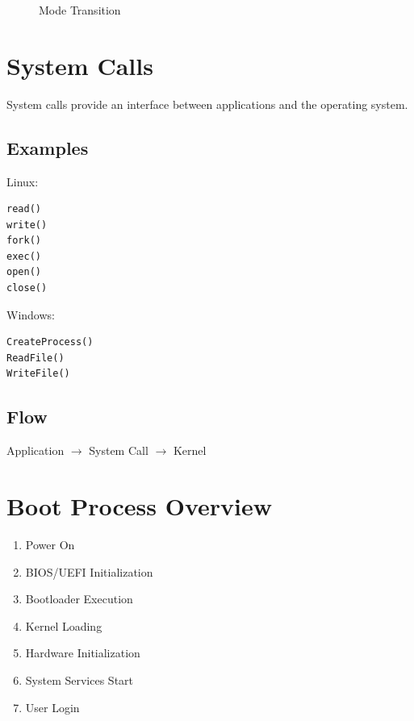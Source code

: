 \begin{figure}[H]
\centering
{}
\caption{Mode Transition}
\end{figure}

\section{System Calls}

System calls provide an interface between applications and the operating system.

\subsection{Examples}

Linux:

\begin{verbatim}
read()
write()
fork()
exec()
open()
close()
\end{verbatim}

Windows:

\begin{verbatim}
CreateProcess()
ReadFile()
WriteFile()
\end{verbatim}

\subsection{Flow}

Application $\rightarrow$ System Call $\rightarrow$ Kernel

\section{Boot Process Overview}

\begin{enumerate}
\item Power On
\item BIOS/UEFI Initialization
\item Bootloader Execution
\item Kernel Loading
\item Hardware Initialization
\item System Services Start
\item User Login
\end{enumerate}

